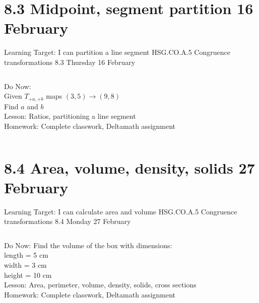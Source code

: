 \section{8.3 Midpoint, segment partition \hfill 16 February \,}
\begin{frame}{Learning Target: I can partition a line segment}
  {HSG.CO.A.5 Congruence transformations \hfill \alert{8.3 Thursday 16 February}}
  \begin{columns}
    Do Now: \\Given $T_{+a,+b}$ maps $(3,5) \rightarrow (9,8)$ \\
    Find $a$ and $b$ \\[0.5cm]
    Lesson: Ratios, partitioning a line segment \\
    Homework: Complete classwork, Deltamath assignment
    \begin{flushright}
    \end{flushright}
  \end{columns}
\end{frame}

\section{8.4 Area, volume, density, solids \hfill 27 February \,}
\begin{frame}{Learning Target: I can calculate area and volume}
  {HSG.CO.A.5 Congruence transformations \hfill \alert{8.4 Monday 27 February}}
  \begin{columns}
    Do Now: Find the volume of the box with dimensions: \\
    length = 5 cm \\
    width = 3 cm\\
    height = 10 cm \\[0.5cm]
    Lesson: Area, perimeter, volume, density, solids, cross sections \\
    Homework: Complete classwork, Deltamath assignment
    \begin{flushright}
    \end{flushright}
  \end{columns}
\end{frame}

